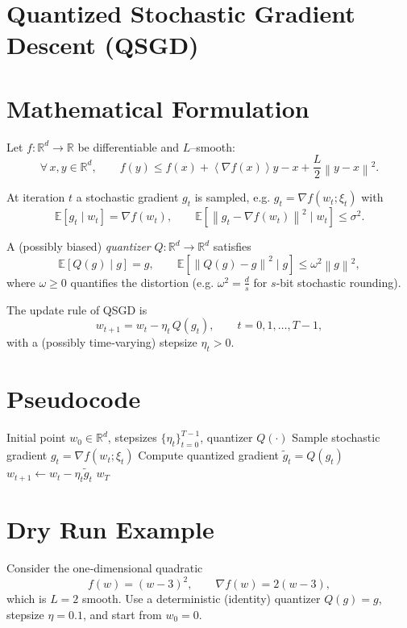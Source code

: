 \documentclass{article}
\newcommand{\E}{\mathbb{E}}
\newcommand{\R}{\mathbb{R}}
\newcommand{\norm}[1]{\left\lVert#1\right\rVert}
\newcommand{\inner}[1]{\left\langle#1\right\rangle}
\begin{document}
\section*{Quantized Stochastic Gradient Descent (QSGD)}

\section*{Mathematical Formulation}
Let $f:\R^{d}\rightarrow\R$ be differentiable and $L$–smooth:
\[
\forall\,x,y\in\R^{d},\qquad 
f(y)\le f(x)+\inner{\nabla f(x)}{y-x}+\frac{L}{2}\norm{y-x}^{2}. \tag{1}
\]

At iteration $t$ a stochastic gradient $g_{t}$ is sampled, e.g. $g_{t}=\nabla f(w_{t};\xi_{t})$ with
\[
\E[g_{t}\mid w_{t}]=\nabla f(w_{t}),\qquad 
\E\!\left[\norm{g_{t}-\nabla f(w_{t})}^{2}\mid w_{t}\right]\le\sigma^{2}. \tag{2}
\]

A (possibly biased) \emph{quantizer} $Q:\R^{d}\rightarrow\R^{d}$ satisfies
\[
\E[Q(g)\mid g]=g,\qquad 
\E\!\left[\norm{Q(g)-g}^{2}\mid g\right]\le \omega^{2}\norm{g}^{2},\tag{3}
\]
where $\omega\ge0$ quantifies the distortion (e.g. $\omega^{2}= \frac{d}{s}$ for $s$‑bit stochastic rounding).

The update rule of QSGD is
\[
w_{t+1}=w_{t}-\eta_{t}\,Q(g_{t}),\qquad t=0,1,\dots,T-1, \tag{4}
\]
with a (possibly time‑varying) stepsize $\eta_{t}>0$.

\section*{Pseudocode}
\begin{algorithm}[H]
\caption{Quantized Stochastic Gradient Descent}
\begin{algorithmic}[1]
\REQUIRE Initial point $w_{0}\in\R^{d}$, stepsizes $\{\eta_{t}\}_{t=0}^{T-1}$, quantizer $Q(\cdot)$
    \STATE Sample stochastic gradient $g_{t}=\nabla f(w_{t};\xi_{t})$
    \STATE Compute quantized gradient $\tilde g_{t}=Q(g_{t})$
    \STATE $w_{t+1}\leftarrow w_{t}-\eta_{t}\tilde g_{t}$
\ENDFOR
\RETURN $w_{T}$
\end{algorithmic}
\end{algorithm}

\section*{Dry Run Example}
Consider the one‑dimensional quadratic 
\[
f(w)=(w-3)^{2},\qquad \nabla f(w)=2(w-3),
\]
which is $L=2$ smooth.  Use a deterministic (identity) quantizer $Q(g)=g$, stepsize $\eta=0.1$, and start from $w_{0}=0$.
\end{document}

